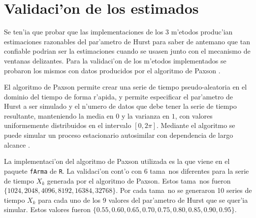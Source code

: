 \section{Validaci'on de los estimados} \label{sect:validacion}

Se ten'ia que probar que las implementaciones de los 3 m'etodos produc'ian
estimaciones razonables del par'ametro de Hurst para saber de antemano que tan
confiable podrian ser la estimaciones cuando se usasen junto con el mecanismo
de ventanas delizantes. Para la validaci'on de los m'etodos implementados se
probaron los mismos con datos producidos por el algoritmo de Paxson
\cite{Paxson95fastapproximation}.

El algoritmo de Paxson permite crear una serie de tiempo pseudo-aleatoria en
el dominio del tiempo de forma r'apida, y permite especificar el par'ametro de
Hurst a ser simulado y el n'umero de datos que debe tener la serie de tiempo
resultante, manteniendo la media en $0$ y la varianza en $1$, con valores
uniformemente distribuidos en el intervalo $[0,2\pi]$. Mediante el algoritmo
se puede simular un proceso estacionario autosimilar con dependencia de largo
alcance \cite{Paxson95fastapproximation}.

La implementaci'on del algoritmo de Paxson utilizada es la que viene en el 
paquete {\tt fArma} de {\tt R}. La validaci'on cont'o con 6 tama~nos diferentes
para la serie de tiempo $X_k$ generada por el algoritmo de Paxson. Estos 
tama~nos fueron $\{1024, 2048, 4096, 8192, 16384, 32768\}$. Por cada tama~no se
generaron 10 series de tiempo $X_k$ para cada uno de los 9 valores del
par'ametro de Hurst que se quer'ia simular. Estos valores fueron
$\{0.55, 0.60, 0.65, 0.70, 0.75, 0.80, 0.85, 0.90, 0.95 \}$. 

